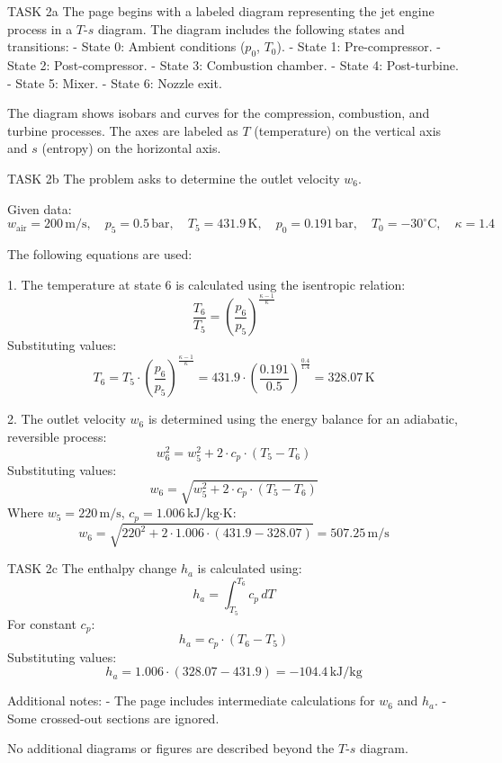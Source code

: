 TASK 2a  
The page begins with a labeled diagram representing the jet engine process in a \( T \)-\( s \) diagram. The diagram includes the following states and transitions:  
- State 0: Ambient conditions (\( p_0 \), \( T_0 \)).  
- State 1: Pre-compressor.  
- State 2: Post-compressor.  
- State 3: Combustion chamber.  
- State 4: Post-turbine.  
- State 5: Mixer.  
- State 6: Nozzle exit.  

The diagram shows isobars and curves for the compression, combustion, and turbine processes. The axes are labeled as \( T \) (temperature) on the vertical axis and \( s \) (entropy) on the horizontal axis.  

TASK 2b  
The problem asks to determine the outlet velocity \( w_6 \).  

Given data:  
\[
w_{\text{air}} = 200 \, \text{m/s}, \quad p_5 = 0.5 \, \text{bar}, \quad T_5 = 431.9 \, \text{K}, \quad p_0 = 0.191 \, \text{bar}, \quad T_0 = -30^\circ\text{C}, \quad \kappa = 1.4
\]  

The following equations are used:  

1. The temperature at state 6 is calculated using the isentropic relation:  
\[
\frac{T_6}{T_5} = \left( \frac{p_6}{p_5} \right)^{\frac{\kappa - 1}{\kappa}}
\]  
Substituting values:  
\[
T_6 = T_5 \cdot \left( \frac{p_6}{p_5} \right)^{\frac{\kappa - 1}{\kappa}} = 431.9 \cdot \left( \frac{0.191}{0.5} \right)^{\frac{0.4}{1.4}} = 328.07 \, \text{K}
\]  

2. The outlet velocity \( w_6 \) is determined using the energy balance for an adiabatic, reversible process:  
\[
w_6^2 = w_5^2 + 2 \cdot c_p \cdot (T_5 - T_6)
\]  
Substituting values:  
\[
w_6 = \sqrt{w_5^2 + 2 \cdot c_p \cdot (T_5 - T_6)}
\]  
Where \( w_5 = 220 \, \text{m/s} \), \( c_p = 1.006 \, \text{kJ/kg·K} \):  
\[
w_6 = \sqrt{220^2 + 2 \cdot 1.006 \cdot (431.9 - 328.07)} = 507.25 \, \text{m/s}
\]  

TASK 2c  
The enthalpy change \( h_a \) is calculated using:  
\[
h_a = \int_{T_5}^{T_6} c_p \, dT
\]  
For constant \( c_p \):  
\[
h_a = c_p \cdot (T_6 - T_5)
\]  
Substituting values:  
\[
h_a = 1.006 \cdot (328.07 - 431.9) = -104.4 \, \text{kJ/kg}
\]  

Additional notes:  
- The page includes intermediate calculations for \( w_6 \) and \( h_a \).  
- Some crossed-out sections are ignored.  

No additional diagrams or figures are described beyond the \( T \)-\( s \) diagram.